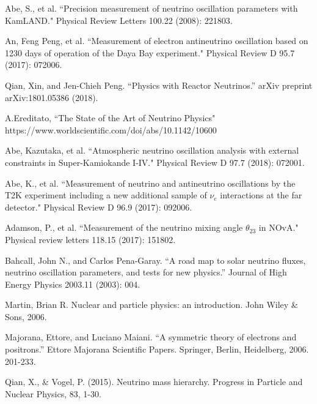 \documentclass[preprint,12pt]{elsarticle}
\numberwithin{equation}{section}
\begin{document}
\begin{thebibliography}{00}
 Abe, S., et al. ``Precision measurement of neutrino oscillation parameters with KamLAND." Physical Review Letters 100.22 (2008): 221803.

 An, Feng Peng, et al. ``Measurement of electron antineutrino oscillation based on 1230 days of operation of the Daya Bay experiment." Physical Review D 95.7 (2017): 072006.

 Qian, Xin, and Jen-Chieh Peng. ``Physics with Reactor Neutrinos.'' arXiv preprint arXiv:1801.05386 (2018).

 A.Ereditato, ``The State of the Art of Neutrino Physics" https://www.worldscientific.com/doi/abs/10.1142/10600

 Abe, Kazutaka, et al. ``Atmospheric neutrino oscillation analysis with external constraints in Super-Kamiokande I-IV." Physical Review D 97.7 (2018): 072001.

 Abe, K., et al. ``Measurement of neutrino and antineutrino oscillations by the T2K experiment including a new additional sample of $\nu_e$ interactions at the far detector." Physical Review D 96.9 (2017): 092006.

 Adamson, P., et al. ``Measurement of the neutrino mixing angle $\theta_{23}$ in NOvA." Physical review letters 118.15 (2017): 151802.


 Bahcall, John N., and Carlos Pena-Garay. ``A road map to solar neutrino fluxes, neutrino oscillation parameters, and tests for new physics.'' Journal of High Energy Physics 2003.11 (2003): 004.

 Martin, Brian R. Nuclear and particle physics: an introduction. John Wiley \& Sons, 2006.

 Majorana, Ettore, and Luciano Maiani. ``A symmetric theory of electrons and positrons.'' Ettore Majorana Scientific Papers. Springer, Berlin, Heidelberg, 2006. 201-233.

 Qian, X., \& Vogel, P. (2015). Neutrino mass hierarchy. Progress in Particle and Nuclear Physics, 83, 1-30.




\end{thebibliography}
\end{document}
